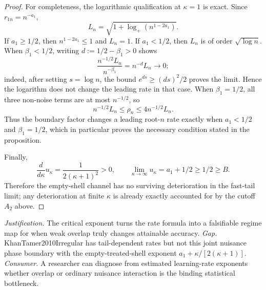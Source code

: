 \documentclass{article}
\begin{document}
\begin{proof}
For completeness, the logarithmic qualification at \(\kappa=1\) is exact.  Since \(r_{1n}=n^{-a_1}\),
\[
L_n=\sqrt{1+\log_+(n^{1-2a_1})}.
\]
If \(a_1\geq1/2\), then \(n^{1-2a_1}\leq1\) and \(L_n=1\).  If \(a_1<1/2\), then \(L_n\) is of order \(\sqrt{\log n}\).  When \(\beta_1<1/2\), writing \(d:=1/2-\beta_1>0\) shows
\[
\frac{n^{-1/2}L_n}{n^{-\beta_1}}=n^{-d}L_n\longrightarrow0;
\]
indeed, after setting \(s=\log n\), the bound \(e^{ds}\geq (ds)^2/2\) proves the limit.  Hence the logarithm does not change the leading rate in that case.  When \(\beta_1=1/2\), all three non-noise terms are at most \(n^{-1/2}\), so
\[
n^{-1/2}L_n\leq\rho_n\leq4n^{-1/2}L_n.
\]
Thus the boundary factor changes a leading root-\(n\) rate exactly when \(a_1<1/2\) and \(\beta_1=1/2\), which in particular proves the necessary condition stated in the proposition.

Finally,
\[
\frac{d}{d\kappa}u_\kappa=\frac{1}{2(\kappa+1)^2}>0,
\qquad
\lim_{\kappa\to\infty}u_\kappa=a_1+1/2\geq1/2\geq B.
\]
Therefore the empty-shell channel has no surviving deterioration in the fast-tail limit; any deterioration at finite \(\kappa\) is already exactly accounted for by the cutoff \(A_2\) above.
\end{proof}
\par\smallskip\noindent \textit{Justification.} The critical exponent turns the rate formula into a falsifiable regime map for when weak overlap truly changes attainable accuracy. \textit{Gap.} KhanTamer2010Irregular has tail-dependent rates but not this joint nuisance phase boundary with the empty-treated-shell exponent \(a_1+\kappa/[2(\kappa+1)]\). \textit{Consumer.} A researcher can diagnose from estimated learning-rate exponents whether overlap or ordinary nuisance interaction is the binding statistical bottleneck.
\end{document}
